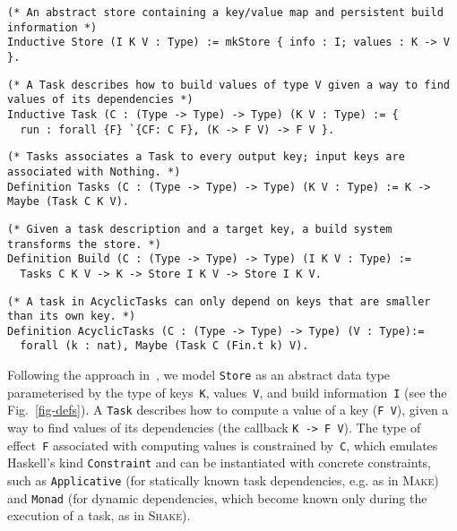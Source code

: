 \documentclass[sigplan]{acmart}\settopmatter{printfolios=true,printccs=false,printacmref=false}
\newcommand{\hs}{\texttt}
\newcommand{\Make}{\textsc{Make}\xspace}
\newcommand{\Shake}{\textsc{Shake}\xspace}
\begin{document}
\begin{figure*}[t]
\begin{verbatim}
(* An abstract store containing a key/value map and persistent build information *)
Inductive Store (I K V : Type) := mkStore { info : I; values : K -> V }.
\end{verbatim}
\vspace{-1mm}
\begin{verbatim}
(* A Task describes how to build values of type V given a way to find values of its dependencies *)
Inductive Task (C : (Type -> Type) -> Type) (K V : Type) := {
  run : forall {F} `{CF: C F}, (K -> F V) -> F V }.
\end{verbatim}
\vspace{-1mm}
\begin{verbatim}
(* Tasks associates a Task to every output key; input keys are associated with Nothing. *)
Definition Tasks (C : (Type -> Type) -> Type) (K V : Type) := K -> Maybe (Task C K V).
\end{verbatim}
\vspace{-1mm}
\begin{verbatim}
(* Given a task description and a target key, a build system transforms the store. *)
Definition Build (C : (Type -> Type) -> Type) (I K V : Type) :=
  Tasks C K V -> K -> Store I K V -> Store I K V.
\end{verbatim}
\vspace{-1mm}
\begin{verbatim}
(* A task in AcyclicTasks can only depend on keys that are smaller than its own key. *)
Definition AcyclicTasks (C : (Type -> Type) -> Type) (V : Type):=
  forall (k : nat), Maybe (Task C (Fin.t k) V).
\end{verbatim}
\vspace{-4mm}
\caption{Build system abstractions in Coq.}\label{fig-defs}
\vspace{-4mm}
\end{figure*}

Following the approach in~\cite{Mokhov2018icfp}, we model \hs{Store} as
an abstract data type parameterised by the type of keys~\hs{K}, values~\hs{V},
and build information~\hs{I} (see the Fig.~\ref{fig-defs}). A \hs{Task}
describes how to compute a value of a key (\hs{F V}), given a way to find values
of its dependencies (the callback \hs{K -> F V}). The type of effect~\hs{F}
associated with computing values is constrained by~\hs{C}, which emulates
Haskell's kind \hs{Constraint} and can be instantiated with concrete constraints,
such as \hs{Applicative} (for statically known task dependencies, e.g. as in \Make)
and \hs{Monad} (for dynamic dependencies, which become known only during the
execution of a task, as in \Shake).
\end{document}
